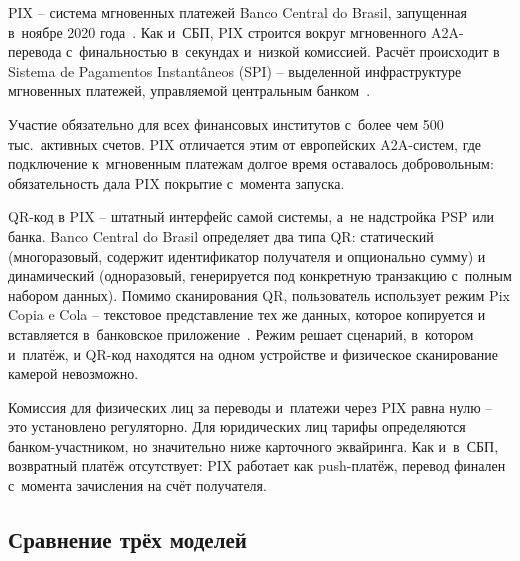 PIX -- система мгновенных платежей Banco Central do Brasil,
запущенная в~ноябре 2020 года~\cite{pix}. Как и~СБП, PIX строится
вокруг мгновенного A2A-перевода с~финальностью в~секундах и~низкой
комиссией. Расчёт происходит в Sistema de Pagamentos Instantâneos
(SPI) -- выделенной инфраструктуре мгновенных платежей,
управляемой центральным банком~\cite{pix-spi}.

Участие обязательно для всех финансовых институтов с~более чем 500
тыс.\ активных счетов. PIX отличается этим от европейских A2A-систем,
где подключение к~мгновенным платежам долгое время оставалось
добровольным: обязательность дала PIX покрытие с~момента запуска.

QR-код в PIX -- штатный интерфейс самой системы, а~не надстройка
PSP или банка. Banco Central do Brasil определяет два типа QR:
статический (многоразовый, содержит идентификатор получателя
и опционально сумму) и динамический (одноразовый, генерируется под
конкретную транзакцию с~полным набором данных). Помимо сканирования
QR, пользователь использует режим Pix Copia
e Cola -- текстовое представление тех же данных, которое копируется
и вставляется в~банковское приложение~\cite{pix-faq}. Режим
решает сценарий, в~котором и~платёж, и QR-код находятся на одном
устройстве и физическое сканирование камерой невозможно.

Комиссия для физических лиц за переводы и~платежи через PIX
равна нулю -- это установлено регуляторно. Для юридических лиц
тарифы определяются банком-участником, но значительно ниже
карточного эквайринга. Как и~в~СБП, возвратный платёж отсутствует:
PIX работает как push-платёж, перевод финален с~момента зачисления
на счёт получателя.

\subsection*{Сравнение трёх моделей}

